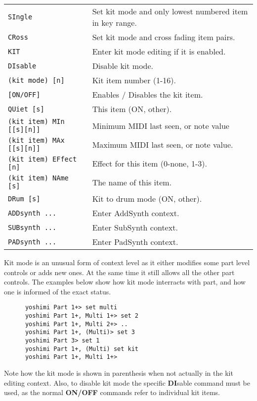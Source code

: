 \begin{table}[H]
\begin{tabular}{l l}
\texttt{SIngle} &
   Set kit mode and only lowest numbered item in key range. \\
\texttt{CRoss} &
   Set kit mode and cross fading item pairs. \\
\texttt{KIT} &
   Enter kit mode editing if it is enabled. \\
\texttt{DIsable} &
   Disable kit mode. \\
   \texttt{(kit mode) [n]} &
      Kit item number (1-16). \\
   \texttt{[ON/OFF]} &
      Enables / Disables the kit item. \\
   \texttt{QUiet [s]} &
      This item (ON, {other}). \\
   \texttt{(kit item) MIn [[s][n]]} &
      Minimum MIDI last seen, or note value   \\
   \texttt{(kit item) MAx [[s][n]]} &
      Maximum MIDI last seen, or note value.   \\
   \texttt{(kit item) EFfect [n]} &
      Effect for this item (0-none, 1-3). \\
   \texttt{(kit item) NAme [s]} &
      The name of this item. \\
    \texttt{DRum [s]} &
      Kit to drum mode (ON, {other}). \\
\texttt{ADDsynth ...} &
   Enter AddSynth context. \\
\texttt{SUBsynth ...} &
   Enter SubSynth context. \\
\texttt{PADsynth ...} &
   Enter PadSynth context. \\
      \end{tabular}
   \end{table}

   Kit mode is an unusual form of context level as it either modifies some
   part level controls or adds new ones. At the same time it still allows
   all the other part controls. The examples below show how kit mode
   interracts with part, and how one is informed of the exact status.

   \begin{verbatim}
      yoshimi Part 1+> set multi
      yoshimi Part 1+, Multi 1+> set 2
      yoshimi Part 1+, Multi 2+> ..
      yoshimi Part 1+, (Multi)> set 3
      yoshimi Part 3> set 1
      yoshimi Part 1+, (Multi) set kit
      yoshimi Part 1+, Multi 1+>
   \end{verbatim}

   Note how the kit mode is shown in parenthesis when not actually in the kit
   editing context. Also, to disable kit mode the specific \textbf{DI}sable
   command must be used, as the normal \textbf{ON/OFF} commands refer to
   individual kit items.

